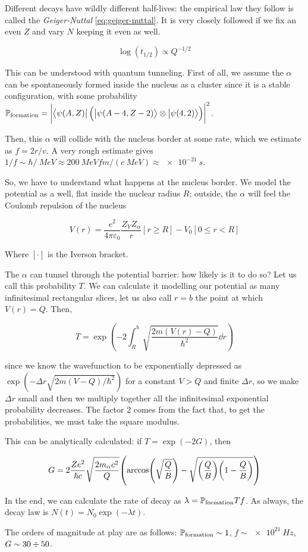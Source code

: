 \documentclass[main.tex]{subfiles}
\begin{document}
Different decays have wildly different half-lives: the empirical law they follow is called the \emph{Geiger-Nuttal} \eqref{eq:geiger-nuttal}. It is very closely followed if we fix an even \(Z\) and vary \(N\) keeping it even as well.

\begin{equation} \label{eq:geiger-nuttal}
    \log(t_{1/2} ) \propto Q^{-1/2}
\end{equation}

This can be understood with quantum tunneling. First of all, we assume the \(\alpha\) can be spontaneously formed inside the nucleus as a cluster since it is a stable configuration, with some probability \(\P _ \text{formation} = \abs{\bra{\psi(A, Z)} \qty(\ket{\psi(A-4, Z-2)} \otimes \ket{\psi(4, 2)})}^2 \).

Then, this \(\alpha\) will collide with the nucleus border at some rate, which we estimate as \(f = 2 r / v\). A very rough estimate gives \(1/f \sim \hbar/\SI{}{MeV} \approx \SI{200}{MeVfm}/ (c\SI{}{MeV}) \approx \SI{e-21}{s} \).

So, we have to understand what happens at the nucleus border. We model the potential as a well, flat inside the nuclear radius \(R\); outside, the \(\alpha\) will feel the Coulomb repulsion of the nucleus

\begin{equation}
    V(r) = \frac{e^2}{4 \pi \varepsilon_0} \frac{Z_Y Z_\alpha}{r} [r \geq R] - V_0 [0 \leq r < R]
\end{equation}

Where \([\cdot]\) is the Iverson bracket.

The \(\alpha\) can tunnel through the potential barrier: how likely is it to do so? Let us call this probability \(T\). We can calculate it modelling our potential as many infinitesimal rectangular slices, let us also call \(r=b\) the point at which \(V(r) = Q\). Then,

\begin{equation}
    T = \exp(-2 \int _{R}   ^{b} \sqrt{\frac{2m(V(r) - Q)}{\hbar^2}}  \dd{r}  )
\end{equation}

since we know the wavefunction to be exponentially depressed as \(\exp(-\Delta r \sqrt{2m(V-Q)/\hbar^2} ) \) for a constant \(V>Q\) and finite \(\Delta r\), so we make \(\Delta r\) small and then we multiply together all the infinitesimal exponential probability decreases. The factor 2 comes from the fact that, to get the probabilities, we must take the square modulus.

This can be analytically calculated: if \(T = \exp(-2G) \), then

\begin{equation}
G = 2 \frac{Ze^2}{\hbar c} \sqrt{\frac{2m_\alpha c^2}{Q}}
\qty(\arccos(\sqrt{\frac{Q}{B}} ) - \sqrt{\qty(\frac{Q}{B}) \qty(1 - \frac{Q}{B})} )
\end{equation}

In the end, we can calculate the rate of decay as \(\lambda = \P _ \text{formation} T f\). As always, the decay law is \(N(t) = N_0 \exp(-\lambda t) \).

The orders of magnitude at play are as follows: \(\P _{\text{formation}} \sim 1 \), \(f \sim \SI{e21}{Hz} \), \(G \sim 30 \divisionsymbol 50\).
\end{document}
